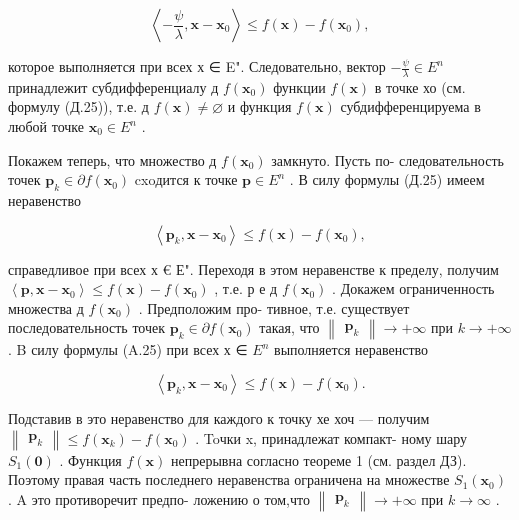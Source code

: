 \documentclass[8pt]{extarticle}
\begin{document}
\[
\left\langle  {-\frac{\psi }{\lambda },\mathbf{x} - {\mathbf{x}}_{0}}\right\rangle   \leq  f\left( \mathbf{x}\right)  - f\left( {\mathbf{x}}_{0}\right) ,
\]

которое выполняется при всех х ∈ E". Следовательно, вектор \(- \frac{\psi }{\lambda } \in  {E}^{n}\) принадлежит субдифференциалу д \(f\left( {\mathbf{x}}_{0}\right)\) функции \(f\left( \mathbf{x}\right)\) в точке хо (см. формулу (Д.25)), т.е. д \(f\left( \mathbf{x}\right)  \neq  \varnothing\) и функция \(f\left( \mathbf{x}\right)\) субдифференцируема в любой точке \({\mathbf{x}}_{0} \in  {E}^{n}\) .

Покажем теперь, что множество д \(f\left( {\mathbf{x}}_{0}\right)\) замкнуто. Пусть по- следовательность точек \({\mathbf{p}}_{k} \in  \partial f\left( {\mathbf{x}}_{0}\right)\) cxoдится к точке \(\mathbf{p} \in  {E}^{n}\) . В силу формулы (Д.25) имеем неравенство

\[
\left\langle  {{\mathbf{p}}_{k},\mathbf{x} - {\mathbf{x}}_{0}}\right\rangle   \leq  f\left( \mathbf{x}\right)  - f\left( {\mathbf{x}}_{0}\right) ,
\]

справедливое при всех х € Е". Переходя в этом неравенстве к пределу, получим \(\left\langle  {\mathbf{p},\mathbf{x} - {\mathbf{x}}_{0}}\right\rangle   \leq  f\left( \mathbf{x}\right)  - f\left( {\mathbf{x}}_{0}\right)\) , т.е. р е д \(f\left( {\mathbf{x}}_{0}\right)\) . Докажем ограниченность множества д \(f\left( {\mathbf{x}}_{0}\right)\) . Предположим про- тивное, т.е. существует последовательность точек \({\mathbf{p}}_{k} \in  \partial f\left( {\mathbf{x}}_{0}\right)\) такая, что \(\left\lVert \begin{array}{c} {\mathbf{p}}_{k} \end{array} \right\rVert \rightarrow   + \infty\) при \(k \rightarrow   + \infty\) . B силу формулы (A.25) при всех х ∈ \({E}^{n}\) выполняется неравенство

\[
\left\langle  {{\mathbf{p}}_{k},\mathbf{x} - {\mathbf{x}}_{0}}\right\rangle   \leq  f\left( \mathbf{x}\right)  - f\left( {\mathbf{x}}_{0}\right) .
\]

Подставив в это неравенство для каждого к точку хе хоч — получим \(\left\lVert \begin{array}{c} {\mathbf{p}}_{k} \end{array} \right\rVert \leq  f\left( {\mathbf{x}}_{k}\right)  - f\left( {\mathbf{x}}_{0}\right)\) . Toчки x, принадлежат компакт- ному шару \({S}_{1}\left( \mathbf{0}\right)\) . Функция \(f\left( \mathbf{x}\right)\) непрерывна согласно теореме 1 (см. раздел ДЗ). Поэтому правая часть последнего неравенства ограничена на множестве \({S}_{1}\left( {\mathbf{x}}_{0}\right)\) . A это противоречит предпо- ложению о том,что \(\left\lVert \begin{array}{c} {\mathbf{p}}_{k} \end{array} \right\rVert \rightarrow   + \infty\) при \(k \rightarrow  \infty\) .
\end{document}
